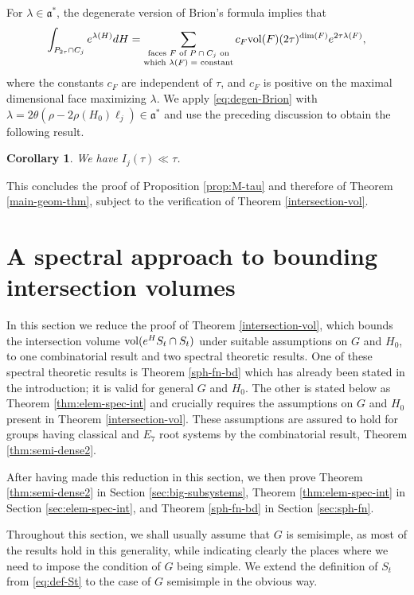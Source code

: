 \documentclass[12pt]{amsart}
\newtheorem{cor}[theorem]{Corollary}
\theoremstyle{remark}
\newcommand{\ga}{\mathfrak a}
\begin{document}
For $\lambda\in\ga^*$, the degenerate version of Brion's formula \cite{Peterson_24} implies that
\begin{equation}\label{eq:degen-Brion}
    \int_{P_{2 \tau} \cap C_j} e^{\lambda(H)} dH = \sum_{\substack{\text{faces $F$ of $P \cap C_j$ on} \\ \text{which  $\lambda(F) = $ constant}}} c_F  \textnormal{vol}(F)  (2 \tau)^{\textnormal{dim}(F)}  e^{2 \tau  \lambda(F)},
\end{equation}
where the constants $c_F$ are independent of $\tau$, and $c_F$ is positive on the maximal dimensional face maximizing $\lambda$. We apply \eqref{eq:degen-Brion} with $\lambda=2\theta(\rho - 2\rho(H_0)\ell_j)\in\ga^*$ and use the preceding discussion to obtain the following result.

\begin{cor}\label{lemma:Brion-bd}
We have $I_j(\tau) \ll \tau$.
\end{cor}

This concludes the proof of Proposition \ref{prop:M-tau} and therefore of Theorem \ref{main-geom-thm}, subject to the verification of Theorem \ref{intersection-vol}.

\section{A spectral approach to bounding intersection volumes} \label{sec_int_vol}

In this section we reduce the proof of Theorem \ref{intersection-vol}, which bounds the intersection volume ${\rm vol}(e^HS_t \cap S_t)$ under suitable assumptions on $G$ and $H_0$, to one combinatorial result and two spectral theoretic results. One of these spectral theoretic results is Theorem \ref{sph-fn-bd} which has already been stated in the introduction; it is valid for general $G$ and $H_0$. The other is stated below as Theorem \ref{thm:elem-spec-int} and crucially requires the assumptions on $G$ and $H_0$ present in Theorem \ref{intersection-vol}. These assumptions are assured to hold for groups having classical and $E_7$ root systems by the combinatorial result, Theorem \ref{thm:semi-dense2}.

After having made this reduction in this section, we then prove Theorem \ref{thm:semi-dense2} in Section \ref{sec:big-subsystems}, Theorem \ref{thm:elem-spec-int} in Section \ref{sec:elem-spec-int}, and Theorem \ref{sph-fn-bd} in Section \ref{sec:sph-fn}.

Throughout this section, we shall usually assume that $G$ is semisimple, as most of the results hold in this generality, while indicating clearly the places where we need to impose the condition of $G$ being simple.  We extend the definition of $S_t$ from \eqref{eq:def-St} to the case of $G$ semisimple in the obvious way.
\end{document}
